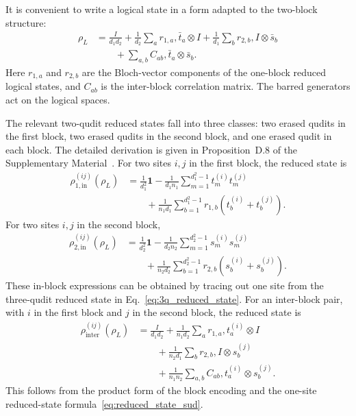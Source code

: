 \documentclass[10pt,twocolumn,superscriptaddress,aps,amsmath,amssymb,citeautoscript,floatfix,prx]{revtex4-2}
\theoremstyle{plain}
\theoremstyle{plain}
\theoremstyle{plain}
\theoremstyle{plain}
\theoremstyle{plain}
\theoremstyle{plain}
\begin{document}
It is convenient to write a logical state in a form adapted to the two-block structure:
$$
\begin{aligned}
\rho_L
&=
\frac{I}{d_1d_2}
+
\frac{1}{d_2}
\sum_a r_{1,a},\bar t_a\otimes I
+
\frac{1}{d_1}
\sum_b r_{2,b},I\otimes\bar s_b
\\
&\qquad
+
\sum_{a,b}
C_{ab},\bar t_a\otimes\bar s_b .
\end{aligned}
$$
Here $r_{1,a}$ and $r_{2,b}$ are the Bloch-vector components of the one-block reduced logical states, and $C_{ab}$ is the inter-block correlation matrix. The barred generators act on the logical spaces.

The relevant two-qudit reduced states fall into three classes: two erased qudits in the first block, two erased qudits in the second block, and one erased qudit in each block. The detailed derivation is given in Proposition~D.8 of the Supplementary Material~\cite{SuppMat}. For two sites $i,j$ in the first block, the reduced state is
$$
\begin{aligned}
\rho_{1,\mathrm{in}}^{(ij)}(\rho_L)
&=
\frac{1}{d_1^2}\mathbf 1
-
\frac{1}{d_1n_1}
\sum_{m=1}^{d_1^2-1}
t_m^{(i)}t_m^{(j)}
\\
&\qquad
+
\frac{1}{n_1d_1}
\sum_{b=1}^{d_1^2-1}
r_{1,b}
\left(
t_b^{(i)}
+
t_b^{(j)}
\right).
\end{aligned}
$$
For two sites $i,j$ in the second block,
$$
\begin{aligned}
\rho_{2,\mathrm{in}}^{(ij)}(\rho_L)
&=
\frac{1}{d_2^2}\mathbf 1
-
\frac{1}{d_2n_2}
\sum_{m=1}^{d_2^2-1}
s_m^{(i)}s_m^{(j)}
\\
&\qquad
+
\frac{1}{n_2d_2}
\sum_{b=1}^{d_2^2-1}
r_{2,b}
\left(
s_b^{(i)}
+
s_b^{(j)}
\right).
\end{aligned}
$$
These in-block expressions can be obtained by tracing out one site from the three-qudit reduced state in Eq.~\eqref{eq:3q_reduced_state}. For an inter-block pair, with $i$ in the first block and $j$ in the second block, the reduced state is
$$
\begin{aligned}
\rho_{\mathrm{inter}}^{(ij)}(\rho_L)
&=
\frac{I}{d_1d_2}
+
\frac{1}{n_1d_2}
\sum_a r_{1,a},t_a^{(i)}\otimes I
\\
&\qquad
+
\frac{1}{n_2d_1}
\sum_b r_{2,b},I\otimes s_b^{(j)} \\
&\qquad
+
\frac{1}{n_1n_2}
\sum_{a,b}
C_{ab},t_a^{(i)}\otimes s_b^{(j)} .
\end{aligned}
$$
This follows from the product form of the block encoding and the one-site reduced-state formula~\eqref{eq:reduced_state_sud}.
\end{document}
